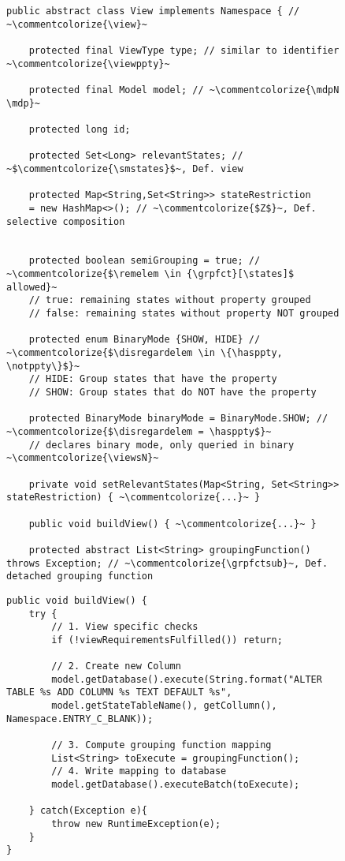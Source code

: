 \documentclass[preview]{standalone}
\begin{document}
\begin{figure}[!htb]
	\begin{lstlisting}[style=javaStyle, caption={Most relevant attributes and methods of class \texttt{View}}, label={lst:classview}]
public abstract class View implements Namespace { // ~\commentcolorize{\view}~
	
	protected final ViewType type; // similar to identifier ~\commentcolorize{\viewppty}~
	
	protected final Model model; // ~\commentcolorize{\mdpN \mdp}~
	
	protected long id; 
	
	protected Set<Long> relevantStates; // ~$\commentcolorize{\smstates}$~, Def. view
	
	protected Map<String,Set<String>> stateRestriction 
	= new HashMap<>(); // ~\commentcolorize{$Z$}~, Def. selective composition

	
	protected boolean semiGrouping = true; // ~\commentcolorize{$\remelem \in {\grpfct}[\states]$ allowed}~
	// true: remaining states without property grouped
	// false: remaining states without property NOT grouped
	
	protected enum BinaryMode {SHOW, HIDE} // ~\commentcolorize{$\disregardelem \in \{\hasppty, \notppty\}$}~
	// HIDE: Group states that have the property 
	// SHOW: Group states that do NOT have the property
	
	protected BinaryMode binaryMode = BinaryMode.SHOW; // ~\commentcolorize{$\disregardelem = \hasppty$}~
	// declares binary mode, only queried in binary ~\commentcolorize{\viewsN}~
	
	private void setRelevantStates(Map<String, Set<String>> stateRestriction) { ~\commentcolorize{...}~ }
	
	public void buildView() { ~\commentcolorize{...}~ }
		
	protected abstract List<String> groupingFunction() throws Exception; // ~\commentcolorize{\grpfctsub}~, Def. detached grouping function
\end{lstlisting}
\end{figure}

\begin{figure}[!htb]
	\begin{lstlisting}[style=javaStyle, caption={Implementation of \texttt{buildView()} function}, label={lst:buildview}]
public void buildView() {
	try {	
		// 1. View specific checks
		if (!viewRequirementsFulfilled()) return;
					
		// 2. Create new Column 
		model.getDatabase().execute(String.format("ALTER TABLE %s ADD COLUMN %s TEXT DEFAULT %s",
		model.getStateTableName(), getCollumn(), Namespace.ENTRY_C_BLANK));
		
		// 3. Compute grouping function mapping
		List<String> toExecute = groupingFunction();				
		// 4. Write mapping to database
		model.getDatabase().executeBatch(toExecute);
		
	} catch(Exception e){
		throw new RuntimeException(e);
	}		
}

\end{lstlisting}
\end{figure}
\end{document}
